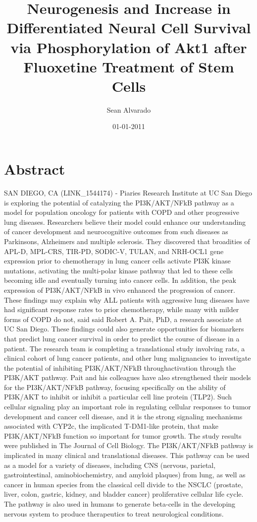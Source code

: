\documentclass{article}%
\title{Neurogenesis and Increase in Differentiated Neural Cell Survival via Phosphorylation of Akt1 after Fluoxetine Treatment of Stem Cells}%
\author{Sean Alvarado}%
\affil{Division of Infection and Immunity, University College London, London, United Kingdom}%
\date{01{-}01{-}2011}%
\begin{document}
%
\normalsize%
\maketitle%
\section{Abstract}%
\label{sec:Abstract}%
SAN DIEGO, CA (LINK\_1544174) {-} Piaries Research Institute at UC San Diego is exploring the potential of catalyzing the PI3K/AKT/NFkB pathway as a model for population oncology for patients with COPD and other progressive lung diseases. Researchers believe their model could enhance our understanding of cancer development and neurocognitive outcomes from such diseases as Parkinsons, Alzheimers and multiple sclerosis.\newline%
They discovered that broadities of APL{-}D, MPL{-}CRS, TIR{-}PD, SODIC{-}V, TULAN, and NRH{-}OCL1 gene expression prior to chemotherapy in lung cancer cells activate PI3K kinase mutations, activating the multi{-}polar kinase pathway that led to these cells becoming idle and eventually turning into cancer cells. In addition, the peak expression of PI3K/AKT/NFkB in vivo enhanced the progression of cancer.\newline%
These findings may explain why ALL patients with aggressive lung diseases have had significant response rates to prior chemotherapy, while many with milder forms of COPD do not, said said Robert A. Pait, PhD, a research associate at UC San Diego. These findings could also generate opportunities for biomarkers that predict lung cancer survival in order to predict the course of disease in a patient.\newline%
The research team is completing a translational study involving rats, a clinical cohort of lung cancer patients, and other lung malignancies to investigate the potential of inhibiting PI3K/AKT/NFkB throughactivation through the PI3K/AKT pathway.\newline%
Pait and his colleagues have also strengthened their models for the PI3K/AKT/NFkB pathway, focusing specifically on the ability of PI3K/AKT to inhibit or inhibit a particular cell line protein (TLP2). Such cellular signaling play an important role in regulating cellular responses to tumor development and cancer cell disease, and it is the strong signaling mechanisms associated with CYP2c, the implicated T{-}DM1{-}like protein, that make PI3K/AKT/NFkB function so important for tumor growth.\newline%
The study results were published in The Journal of Cell Biology.\newline%
The PI3K/AKT/NFkB pathway is implicated in many clinical and translational diseases. This pathway can be used as a model for a variety of diseases, including CNS (nervous, parietal, gastrointestinal, aminobiochemistry, and amyloid plaques) from lung, as well as cancer in human species from the classical cell divide to the NSCLC (prostate, liver, colon, gastric, kidney, and bladder cancer) proliferative cellular life cycle. The pathway is also used in humans to generate beta{-}cells in the developing nervous system to produce therapeutics to treat neurological conditions.
\end{document}
